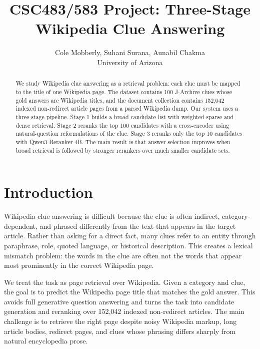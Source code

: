 \documentclass[11pt]{article}
\title{\textbf{CSC483/583 Project: Three-Stage Wikipedia Clue Answering}}
\author{
  Cole Mobberly, Suhani Surana, Aunabil Chakma \\
  University of Arizona \\
}
\date{}
\begin{document}
\maketitle

\begin{abstract}
We study Wikipedia clue answering as a retrieval problem: each clue must be mapped to the title of one Wikipedia page. The dataset contains 100 J-Archive clues whose gold answers are Wikipedia titles, and the document collection contains 152,042 indexed non-redirect article pages from a parsed Wikipedia dump. Our system uses a three-stage pipeline. Stage 1 builds a broad candidate list with weighted sparse and dense retrieval. Stage 2 reranks the top 100 candidates with a cross-encoder using natural-question reformulations of the clue. Stage 3 reranks only the top 10 candidates with Qwen3-Reranker-4B. The main result is that answer selection improves when broad retrieval is followed by stronger rerankers over much smaller candidate sets.
\end{abstract}

\section{Introduction}

Wikipedia clue answering is difficult because the clue is often indirect, category-dependent, and phrased differently from the text that appears in the target article. Rather than asking for a direct fact, many clues refer to an entity through paraphrase, role, quoted language, or historical description. This creates a lexical mismatch problem: the words in the clue are often not the words that appear most prominently in the correct Wikipedia page.

We treat the task as page retrieval over Wikipedia. Given a category and clue, the goal is to predict the Wikipedia page title that matches the gold answer. This avoids full generative question answering and turns the task into candidate generation and reranking over 152,042 indexed non-redirect articles. The main challenge is to retrieve the right page despite noisy Wikipedia markup, long article bodies, redirect pages, and clues whose phrasing differs sharply from natural encyclopedia prose.
\end{document}
